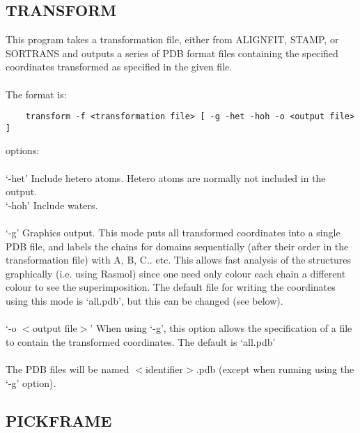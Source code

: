    \subsection{TRANSFORM}

    This program takes a transformation file, either from ALIGNFIT,
    STAMP, or SORTRANS and outputs a series of PDB format files
    containing the specified coordinates transformed as specified in
    the given file.\\
    \\
    The format is:\\

    \begin{scriptsize}\begin{verbatim}
    transform -f <transformation file> [ -g -het -hoh -o <output file> ]
    \end{verbatim} \end{scriptsize}

    options:\\
    \\
    `-het' Include hetero atoms.  Hetero atoms are normally not included
    in the output.\\
    `-hoh' Include waters.\\
    \\
    `-g' Graphics output.  This mode puts all transformed coordinates
    into a single PDB file, and labels the chains for domains
    sequentially (after their order in the transformation file) with A,
    B, C.. etc.  This allows fast analysis of the structures
    graphically (i.e. using Rasmol) since one need only colour each
    chain a different colour to see the superimposition.  The default
    file for writing the coordinates using this mode is `all.pdb', but
    this can be changed (see below).\\
    \\
    `-o $<$output file$>$'  When using `-g', this option allows the
    specification of a file to contain the transformed coordinates.
    The default is `all.pdb'\\
    \\
    The PDB files will be named $<$identifier$>$.pdb (except when running using the `-g'
    option).

    \subsection{PICKFRAME}

